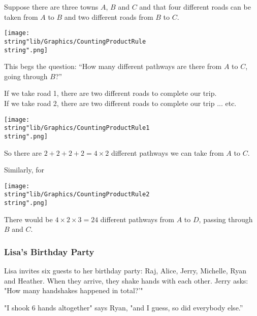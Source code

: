 \documentclass[11pt,a4paper]{book}
\begin{document}
Suppose there are three towns $A$, $B$ and $C$ and that four different
roads can be taken from $A$ to $B$ and two different roads from
$B$ to $C$.
\begin{center}
\texttt{[image: \\string"lib/Graphics/CountingProductRule\\string".png]}
\par\end{center}

This begs the question: ``How many different pathways are there from
$A$ to $C$, going through $B$?''

\begin{minipage}[t]{0.5\textwidth}

If we take road 1, there are two different roads to complete our trip.\\

If we take road 2, there are two different roads to complete our trip
... etc.\\

\end{minipage}
\begin{minipage}[t]{0.2\textwidth}
\begin{center}
\texttt{[image: \\string"lib/Graphics/CountingProductRule1\\string".png]}
\par\end{center}

\end{minipage}

So there are $2+2+2+2=4\times2$ different pathways we can take from
$A$ to $C$.

\newpage

Similarly, for
\begin{center}
\texttt{[image: \\string"lib/Graphics/CountingProductRule2\\string".png]}
\par\end{center}

There would be $4\times2\times3=24$ different pathways from $A$
to $D$, passing through $B$ and $C$.

\subsubsection{Lisa's Birthday Party}

Lisa invites six guests to her birthday party: Raj, Alice, Jerry,
Michelle, Ryan and Heather. When they arrive, they shake hands with
each other. Jerry asks: "How many handshakes happened in total?'"

"I shook 6 hands altogether" says
Ryan, "and I guess, so did everybody else.''
\end{document}
